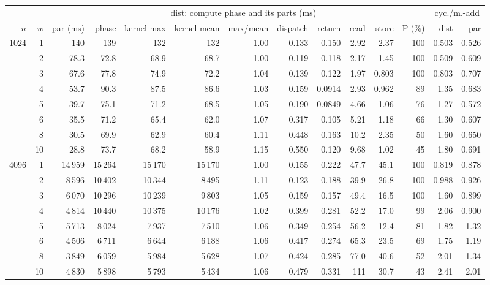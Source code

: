 \begin{tabular}{rrrrrrrrrrrrrr}
\toprule
 & & & \multicolumn{8}{c}{dist: compute phase and its parts (ms)} & & \multicolumn{2}{c}{cyc./m.-add} \\ \cmidrule(lr){4-11} \cmidrule(lr){13-14} $n$ & $w$ & par (ms) & phase & kernel max & kernel mean & max/mean & dispatch & return & read & store & P (\%) & dist & par \\
\midrule
1024 & 1 & 140 & 139 & 132 & 132 & 1.00 & 0.133 & 0.150 & 2.92 & 2.37 & 100 & 0.503 & 0.526 \\
 & 2 & 78.3 & 72.8 & 68.9 & 68.7 & 1.00 & 0.119 & 0.118 & 2.17 & 1.45 & 100 & 0.509 & 0.609 \\
 & 3 & 67.6 & 77.8 & 74.9 & 72.2 & 1.04 & 0.139 & 0.122 & 1.97 & 0.803 & 100 & 0.803 & 0.707 \\
 & 4 & 53.7 & 90.3 & 87.5 & 86.6 & 1.03 & 0.159 & 0.0914 & 2.93 & 0.962 & 89 & 1.35 & 0.683 \\
 & 5 & 39.7 & 75.1 & 71.2 & 68.5 & 1.05 & 0.190 & 0.0849 & 4.66 & 1.06 & 76 & 1.27 & 0.572 \\
 & 6 & 35.5 & 71.2 & 65.4 & 62.0 & 1.07 & 0.317 & 0.105 & 5.21 & 1.18 & 66 & 1.30 & 0.607 \\
 & 8 & 30.5 & 69.9 & 62.9 & 60.4 & 1.11 & 0.448 & 0.163 & 10.2 & 2.35 & 50 & 1.60 & 0.650 \\
 & 10 & 28.8 & 73.7 & 68.2 & 58.9 & 1.15 & 0.550 & 0.120 & 9.68 & 1.02 & 45 & 1.80 & 0.691 \\
\midrule
4096 & 1 & 14\,959 & 15\,264 & 15\,170 & 15\,170 & 1.00 & 0.155 & 0.222 & 47.7 & 45.1 & 100 & 0.819 & 0.878 \\
 & 2 & 8\,596 & 10\,402 & 10\,344 & 8\,495 & 1.11 & 0.123 & 0.188 & 39.9 & 26.8 & 100 & 0.988 & 0.926 \\
 & 3 & 6\,070 & 10\,296 & 10\,239 & 9\,803 & 1.05 & 0.159 & 0.157 & 49.4 & 16.5 & 100 & 1.60 & 0.899 \\
 & 4 & 4\,814 & 10\,440 & 10\,375 & 10\,176 & 1.02 & 0.399 & 0.281 & 52.2 & 17.0 & 99 & 2.06 & 0.900 \\
 & 5 & 5\,713 & 8\,024 & 7\,937 & 7\,510 & 1.06 & 0.349 & 0.254 & 56.2 & 12.4 & 81 & 1.82 & 1.32 \\
 & 6 & 4\,506 & 6\,711 & 6\,644 & 6\,188 & 1.06 & 0.417 & 0.274 & 65.3 & 23.5 & 69 & 1.75 & 1.19 \\
 & 8 & 3\,849 & 6\,059 & 5\,984 & 5\,628 & 1.07 & 0.424 & 0.285 & 77.0 & 40.6 & 52 & 2.01 & 1.34 \\
 & 10 & 4\,830 & 5\,898 & 5\,793 & 5\,434 & 1.06 & 0.479 & 0.331 & 111 & 30.7 & 43 & 2.41 & 2.01 \\
\bottomrule
\end{tabular}
\par{}
